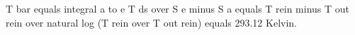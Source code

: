 T bar equals integral a to e T ds over S e minus S a equals T rein minus T out rein over natural log (T rein over T out rein) equals 293.12 Kelvin.